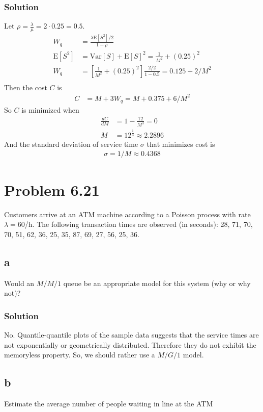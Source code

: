 \documentclass[letterpaper]{amsart}
\begin{document}
\subsubsection*{Solution}
Let $\rho = \frac{\lambda}{\mu}=2\cdot 0.25=0.5$.
\begin{align*}
  W_q&=\frac{\lambda\text{E}[S^2]/2}{1-\rho} \\
  \text{E}[S^2]&=\text{Var}[S]+\text{E}[S]^2 = \frac{1}{M^2} + (0.25)^2 \\
  W_q&=\left[\frac{1}{M^2} + (0.25)^2\right]\frac{2/2}{1-0.5} = 0.125 + 2/M^2\\
\end{align*}
Then the cost $C$ is
\begin{align*}
  C &= M + 3W_q= M + 0.375 + 6/M^2
\end{align*}
So $C$ is minimized when
\begin{align*}
  \frac{dC}{dM} &= 1 - \frac{12}{M^3}=0\\
  M&=12^{\frac{1}{3}} \approx 2.2896
\end{align*}
And the standard deviation of service time $\sigma$ that minimizes cost is
\begin{align*}
\sigma=1/M\approx 0.4368
\end{align*}


\section{Problem 6.21} %
Customers arrive at an ATM machine according to a Poisson process with
rate $\lambda= 60$/h. The following transaction times are observed (in seconds):
28, 71, 70, 70, 51, 62, 36, 25, 35, 87, 69, 27, 56, 25, 36.
\subsection*{a}
Would an $M/M/1$ queue be an appropriate model for this system (why
or why not)?
\subsubsection*{Solution}
No. Quantile-quantile plots of the sample data suggests that the service times are
not exponentially or geometrically distributed.
Therefore they do not exhibit the memoryless property.
So, we should rather use a $M/G/1$ model.
\subsection*{b}
Estimate the average number of people waiting in line at the ATM
\end{document}
